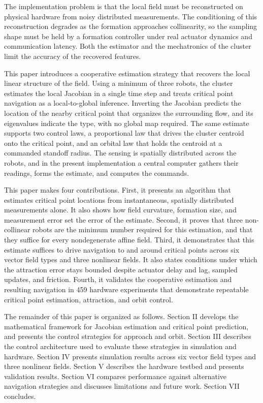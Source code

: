 \documentclass[lettersize,journal]{IEEEtran}
\newcommand{\rev}[1]{#1}
\begin{document}
The implementation problem is that the local field must be reconstructed on physical hardware from noisy distributed measurements. The conditioning of this reconstruction degrades as the formation approaches collinearity, so the sampling shape must be held by a formation controller under real actuator dynamics and communication latency. Both the estimator and the mechatronics of the cluster limit the accuracy of the recovered features.

This paper introduces a cooperative estimation strategy that recovers the local linear structure of the field. Using a minimum of three robots, the cluster estimates the local Jacobian in a single time step and treats critical point navigation as a local-to-global inference. Inverting the Jacobian predicts the location of the nearby critical point that organizes the surrounding flow, and its eigenvalues indicate the type, with no global map required. The same estimate supports two control laws, a proportional law that drives the cluster centroid onto the critical point, and an orbital law that holds the centroid at a commanded standoff radius. The sensing is spatially distributed across the robots, and in the present implementation a central computer gathers their readings, forms the estimate, and computes the commands.

This paper makes four contributions. First, it presents an algorithm that estimates critical point locations from instantaneous, spatially distributed measurements alone. It also shows how field curvature, formation size, and measurement error set the error of the estimate. Second, it proves that three non-collinear robots are the minimum number required for this estimation, and that they suffice for every nondegenerate affine field. Third, it demonstrates that this estimate suffices to drive navigation to and around critical points across six vector field types and three nonlinear fields. It also states conditions under which the attraction error stays bounded despite actuator delay and lag, sampled updates, and friction. Fourth, it validates the cooperative estimation and resulting navigation in \rev{459} hardware experiments that demonstrate repeatable critical point estimation, attraction, and orbit control.

The remainder of this paper is organized as follows. Section II develops the mathematical framework for Jacobian estimation and critical point prediction, and presents the control strategies for approach and orbit. Section III describes the control architecture used to evaluate these strategies in simulation and hardware. Section IV presents simulation results across six vector field types and three nonlinear fields. Section V describes the hardware testbed and presents validation results. Section VI compares performance against alternative navigation strategies and discusses limitations and future work. Section VII concludes.
\end{document}
